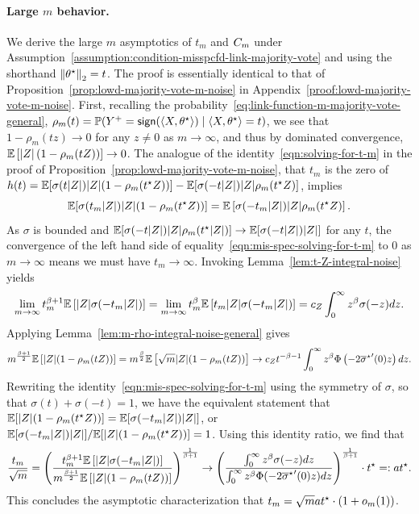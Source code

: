 \paragraph{Large $m$ behavior.}
We derive the large $m$ asymptotics of $t_m$ and $C_m$ under
Assumption~\ref{assumption:condition-misspcfd-link-majority-vote} and using
the shorthand $\left\|{\theta^\star}\right\|_2 = t$. The proof is essentially identical to
that of Proposition~\ref{prop:lowd-majority-vote-m-noise} in
Appendix~\ref{proof:lowd-majority-vote-m-noise}.
First, recalling
the probability~\eqref{eq:link-function-m-majority-vote-general},
$\rho_m(t) = \mathbb{P}(Y^+ = \mathsf{sign}(\langle X, \theta^\star\rangle) \mid \langle X,\theta^\star\rangle = t)$,
we see that $1 - \rho_m(t z) \to 0$ for
any $z \neq 0$ as $m \to \infty$, and thus by dominated convergence,
$\mathbb{E} \left[{|Z|\left({1 - \rho_m(t Z)}\right)}\right] \to 0$.
The analogue of the identity~\eqref{eqn:solving-for-t-m}
in the proof of Proposition~\ref{prop:lowd-majority-vote-m-noise}, that
$t_m$ is the zero of $h(t) = \mathbb{E}[\sigma(t|Z|)|Z|(1 - \rho_m(t^\star Z))]
- \mathbb{E}[\sigma(-t|Z|) |Z| \rho_m(t^\star Z)]$, implies
\begin{equation}
  \mathbb{E}[\sigma(t_m|Z|) |Z|(1 - \rho_m(t^\star Z))]
  = \mathbb{E} \left[{\sigma(-t_m |Z|) |Z| \rho_m(t^\star Z)}\right].
  \label{eqn:mis-spec-solving-for-t-m}
\end{equation}
As $\sigma$ is bounded and $\mathbb{E}[\sigma(-t|Z|) |Z| \rho_m(t^\star |Z|)] \to
\mathbb{E}[\sigma(-t|Z|) |Z|]$ for any $t$, the convergence of the left hand side of
equality~\eqref{eqn:mis-spec-solving-for-t-m} to 0 as $m \to \infty$ means
we must have $t_m \to \infty$.
Invoking
Lemma~\ref{lem:t-Z-integral-noise} yields
\begin{align*}
  \lim_{m \to \infty} t_m^{\beta + 1} \mathbb{E} \left[{|Z| \sigma(-t_m |Z|)}\right]
  =
  \lim_{m \to \infty} t_m^{\beta} \mathbb{E} \left[{t_m|Z| \sigma(-t_m |Z|)}\right]
  = c_Z \int_0^\infty z^\beta \sigma(-z) dz.
\end{align*}
Applying Lemma~\ref{lem:m-rho-integral-noise-general} gives
\begin{align*}
  m^{\frac{\beta+1}{2}}\mathbb{E} \left[{|Z|(1-\rho_m(t Z))}\right]
  =  m^{\frac{\beta}{2}} \mathbb{E} \left[{\sqrt m|Z|(1-\rho_m(t  Z))}\right]
  \to c_Z {t}^{-\beta-1}\int_0^\infty z^\beta \Phi \left(-2{\overline{\sigma}^\star}'(0)z\right) dz.
\end{align*}
Rewriting the identity~\eqref{eqn:mis-spec-solving-for-t-m}
using the symmetry of $\sigma$, so that $\sigma(t) + \sigma(-t) = 1$,
we have the equivalent statement that
$\mathbb{E}[|Z|(1 - \rho_m(t^\star Z))] = \mathbb{E}[\sigma(-t_m |Z|) |Z|]$,
or $\mathbb{E}[\sigma(-t_m |Z|)|Z|] / \mathbb{E}[|Z|(1 - \rho_m(t^\star Z))] = 1$.
Using this identity ratio, we find that
\begin{equation*}
  \frac{t_m}{\sqrt{m}}
  =
  \left(\frac{	t_m^{\beta + 1}\mathbb{E} \left[{|Z| \sigma(-t_m|Z|)}\right]}{
    m^{\frac{\beta+1}{2}} \mathbb{E} \left[{|Z|(1-\rho_m(t  Z))}\right] }\right)^\frac{1}{\beta +1}
  \to
  \left(\frac{\int_{0}^{\infty} z^\beta \sigma(-z) dz}{
    \int_0^\infty z^\beta \Phi(-2{\overline{\sigma}^\star}'(0)z) dz}\right)^{
    \frac{1}{\beta +1}} \cdot t^\star
  = : a t^\star.
\end{equation*}
This concludes the asymptotic characterization that $t_m = \sqrt{m} a t^\star
\cdot(1 + o_m(1))$.

